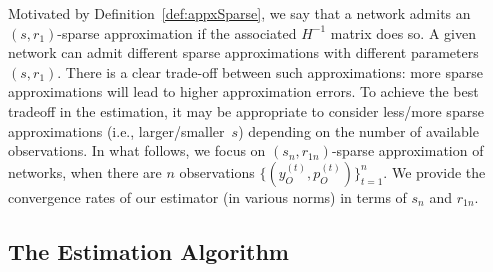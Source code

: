 \documentclass[opre,nonblindrev]{informs3} %
\begin{document}
Motivated by Definition~\ref{def:appxSparse}, we say that
a network
admits an
$(s,r_1)$-sparse approximation if the associated $H^{-1}$  matrix does so.
A given  network can admit different
sparse approximations with different parameters 
$(s, r_1)$.
There is a clear trade-off between such approximations:
more sparse approximations will lead to higher approximation errors.
To achieve the best tradeoff in the estimation,
it may be appropriate to consider less/more sparse
approximations (i.e., larger/smaller~$s$)  depending on the  number of available observations.
In what follows, we  focus on
$(s_n, r_{1n})$-sparse approximation
	of networks, when
	there are $n$ observations $\{({y}^{(t)}_O,{p}^{(t)}_O)\}_{t=1}^n$.
We
provide the convergence rates of our estimator (in various norms) in terms of 
$s_n$ and  $r_{1n}$.



\subsection{The Estimation Algorithm} \label{subse:estimationAlgorithm}
\end{document}
